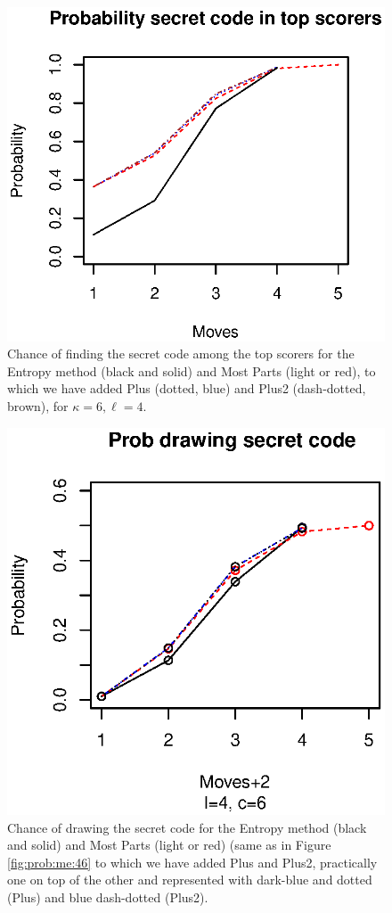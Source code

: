 \documentclass[preprint,12pt]{elsarticle}
\begin{document}
%
\begin{figure}[!htb]
\centering
\includegraphics{top-plus-4-6.eps}
\smallskip
\caption{Chance of finding the secret code among the top scorers for the
  Entropy method (black and solid) and Most Parts (light or
  red), to which we have added Plus (dotted, blue) and Plus2
  (dash-dotted, brown), for $\kappa=6, \ell=4$.\label{fig:top:plus}}
\end{figure} 
%
\begin{figure}[!htb]
\centering\smallskip
\includegraphics{prob-plus-46.eps}
\caption{Chance of drawing the secret code for the
  Entropy method (black and solid) and Most Parts (light or
  red) (same as in Figure \ref{fig:prob:me:46} to which we have added
  Plus and Plus2, practically one on top of the other and represented
  with dark-blue and dotted (Plus) and blue dash-dotted (Plus2). \label{fig:prob:plus:46}}
\end{figure} 
\end{document}
